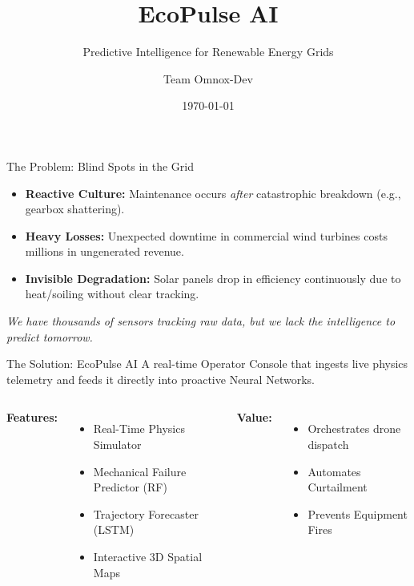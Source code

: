 \documentclass[aspectratio=169]{beamer}
\title[EcoPulse AI]{EcoPulse AI}
\subtitle{Predictive Intelligence for Renewable Energy Grids}
\author{Team Omnox-Dev}
\date{\today}
\begin{document}
\begin{frame}
    \titlepage
\end{frame}

\begin{frame}{The Problem: Blind Spots in the Grid}
    \begin{itemize}
        \item \textbf{Reactive Culture:} Maintenance occurs \textit{after} catastrophic breakdown (e.g., gearbox shattering).
        \item \textbf{Heavy Losses:} Unexpected downtime in commercial wind turbines costs millions in ungenerated revenue.
        \item \textbf{Invisible Degradation:} Solar panels drop in efficiency continuously due to heat/soiling without clear tracking.
    \end{itemize}
    \vspace{0.5cm}
    \textit{We have thousands of sensors tracking raw data, but we lack the intelligence to predict tomorrow.}
\end{frame}

\begin{frame}{The Solution: EcoPulse AI}
    A real-time Operator Console that ingests live physics telemetry and feeds it directly into proactive Neural Networks.
    \vspace{0.5cm}
    \begin{columns}
        \textbf{Features:}
        \begin{itemize}
            \item Real-Time Physics Simulator
            \item Mechanical Failure Predictor (RF)
            \item Trajectory Forecaster (LSTM)
            \item Interactive 3D Spatial Maps
        \end{itemize}
        
        \textbf{Value:}
        \begin{itemize}
            \item Orchestrates drone dispatch
            \item Automates Curtailment
            \item Prevents Equipment Fires
        \end{itemize}
    \end{columns}
\end{frame}
\end{document}
